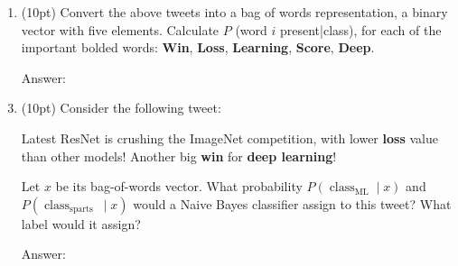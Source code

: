 \documentclass[10pt, a4paper]{article}
\begin{document}
\begin{enumerate}[label = \alph*]
    \item (10pt) Convert the above tweets into a bag of words representation, a binary vector with five elements. Calculate $P$ (word $i$ present|class), for each of the important bolded words: \textbf{Win}, \textbf{Loss}, \textbf{Learning}, \textbf{Score}, \textbf{Deep}.

    \item[Answer:] 

    \item (10pt) Consider the following tweet: 

    Latest ResNet is crushing the ImageNet competition, with lower \textbf{loss} value than other models! Another big \textbf{win} for \textbf{deep learning}!

    Let $x$ be its bag-of-words vector. What probability $P\left(\operatorname{class}_{\mathrm{ML}} \mid x\right)$ and $P\left(\operatorname{class}_{\text {sparts }} \mid x\right)$ would a Naive Bayes classifier assign to this tweet? What label would it assign?

    \item[Answer:] 
\end{enumerate}
\end{document}
